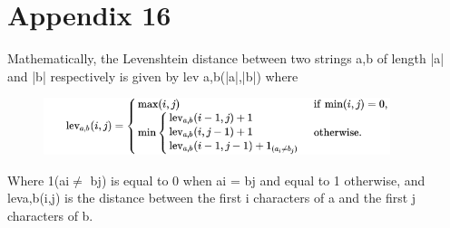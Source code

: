 \section*{Appendix 16}
\label{sec:app16}
Mathematically, the Levenshtein distance between two strings a,b of length |a| and |b| respectively is given by lev a,b(|a|,|b|) where
\begin{figure}[ht!]
  \centering
  \includegraphics[width=0.9\textwidth]{figures/levenshtein.png}
  \label{fig:levenshtein}
\end{figure}
\par

Where 1(ai$\neq$ bj) is equal to 0 when ai = bj and equal to 1 otherwise, and leva,b(i,j) is the distance between the first i characters of a and the first j characters of b.
